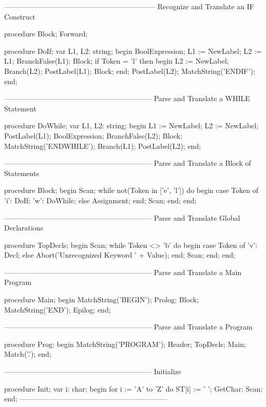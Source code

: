 \documentclass[float=false, crop=false]{standalone}
\begin{document}
\begin{code}
{---------------------------------------------------------------}
{ Recognize and Translate an IF Construct }

procedure Block; Forward;


procedure DoIf;
var L1, L2: string;
begin
   BoolExpression;
   L1 := NewLabel;
   L2 := L1;
   BranchFalse(L1);
   Block;
   if Token = 'l' then begin
      L2 := NewLabel;
      Branch(L2);
      PostLabel(L1);
      Block;
   end;
   PostLabel(L2);
   MatchString('ENDIF');
end;


{--------------------------------------------------------------}
{ Parse and Translate a WHILE Statement }

procedure DoWhile;
var L1, L2: string;
begin
   L1 := NewLabel;
   L2 := NewLabel;
   PostLabel(L1);
   BoolExpression;
   BranchFalse(L2);
   Block;
   MatchString('ENDWHILE');
   Branch(L1);
   PostLabel(L2);
end;


{--------------------------------------------------------------}
{ Parse and Translate a Block of Statements }

procedure Block;
begin
   Scan;
   while not(Token in ['e', 'l']) do begin
      case Token of
       'i': DoIf;
       'w': DoWhile;
      else Assignment;
      end;
      Scan;
   end;
end;


{--------------------------------------------------------------}
{ Parse and Translate Global Declarations }

procedure TopDecls;
begin
   Scan;
   while Token <> 'b' do begin
      case Token of
        'v': Decl;
      else Abort('Unrecognized Keyword ' + Value);
      end;
      Scan;
   end;
end;


{--------------------------------------------------------------}
{ Parse and Translate a Main Program }

procedure Main;
begin
   MatchString('BEGIN');
   Prolog;
   Block;
   MatchString('END');
   Epilog;
end;

{--------------------------------------------------------------}
{  Parse and Translate a Program }

procedure Prog;
begin
   MatchString('PROGRAM');
   Header;
   TopDecls;
   Main;
   Match('.');
end;


{--------------------------------------------------------------}
{ Initialize }

procedure Init;
var i: char;
begin
   for i := 'A' to 'Z' do
      ST[i] := ' ';
   GetChar;
   Scan;
end;
{--------------------------------------------------------------}
\end{code}
\end{document}
